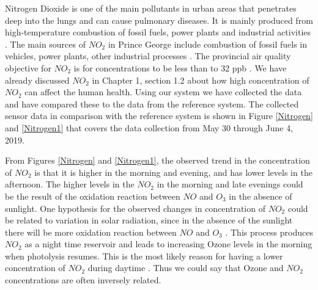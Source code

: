 Nitrogen Dioxide is one of the main pollutants in urban areas that penetrates deep into the lungs and can cause pulmonary diseases. It is mainly produced from high-temperature combustion of fossil fuels, power plants and industrial activities \cite{EnvironmentalQualitySectionMoE2012}. The main sources of ${NO_2}$ in Prince George include combustion of fossil fuels in vehicles, power plants, other industrial processes \cite{Environment2016}. The provincial air quality objective for ${NO_2}$ is for concentrations to be  less than to 32 ppb \cite{Environment2016}. We have already discussed ${NO_2}$ in Chapter 1, section 1.2 about how high concentration of ${NO_2}$ can affect the human health. Using our system we have collected the data and have compared these to the data from the reference system. The collected sensor data in comparison with the reference system is shown in Figure \ref{Nitrogen} and \ref{Nitrogen1} that covers the data collection from May 30 through June 4, 2019. 

From Figures \ref{Nitrogen} and \ref{Nitrogen1}, the observed trend in the concentration of ${NO_2}$ is that it is higher in the morning and evening, and has lower levels in the afternoon. The higher levels in the ${NO_2}$ in the morning and late evenings could be the result of the oxidation reaction between $NO$ and $O_3$ in the absence of sunlight. One hypothesis for the observed changes in concentration of ${NO_2}$ could be related to variation in solar radiation, since in the absence of the sunlight there will be more oxidation reaction between $NO$ and $O_3$ \cite{Environment2010}. This process produces ${NO_2}$ as a night time reservoir and leads to increasing Ozone levels in the morning when photolysis resumes. This is the most likely reason for having a lower concentration of ${NO_2}$ during daytime \cite{rozbicka2014spatiotemporal}. Thus we could say that Ozone and ${NO_2}$ concentrations are often inversely related.  
    

